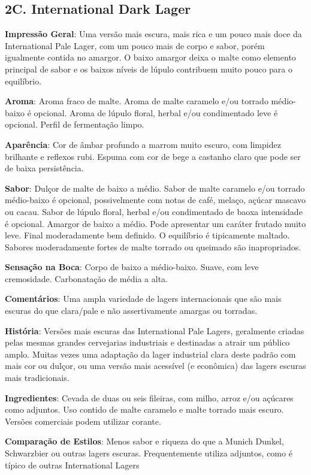 \subsection*{2C. International Dark Lager}
\textbf{Impressão Geral}: Uma versão mais escura, mais rica e um pouco mais doce da International Pale Lager, com um pouco mais de corpo e sabor, porém igualmente contida no amargor. O baixo amargor deixa o malte como elemento principal de sabor e os baixos níveis de lúpulo contribuem muito pouco para o equilíbrio.

\textbf{Aroma}: Aroma fraco de malte. Aroma de malte caramelo e/ou torrado médio-baixo é opcional. Aroma de lúpulo floral, herbal e/ou condimentado leve é opcional. Perfil de fermentação limpo.

\textbf{Aparência}: Cor de âmbar profundo a marrom muito escuro, com limpidez brilhante e reflexos rubi. Espuma com cor de bege a castanho claro que pode ser de baixa persistência.

\textbf{Sabor}: Dulçor de malte de baixo a médio. Sabor de malte caramelo e/ou torrado médio-baixo é opcional, possivelmente com notas de café, melaço, açúcar mascavo ou cacau. Sabor de lúpulo floral, herbal e/ou condimentado de baoxa intensidade é opcional. Amargor de baixo a médio. Pode apresentar um caráter frutado muito leve. Final moderadamente bem definido. O equilíbrio é tipicamente maltado. Sabores moderadamente fortes de malte torrado ou queimado são inapropriados.

\textbf{Sensação na Boca}: Corpo de baixo a médio-baixo. Suave, com leve cremosidade. Carbonatação de média a alta.

\textbf{Comentários}: Uma ampla variedade de lagers internacionais que são mais escuras do que clara/pale e não assertivamente amargas ou torradas.

\textbf{História}: Versões mais escuras das International Pale Lagers, geralmente criadas pelas mesmas grandes cervejarias industriais e destinadas a atrair um público amplo. Muitas vezes uma adaptação da lager industrial clara deste padrão com mais cor ou dulçor, ou uma versão mais acessível (e econômica) das lagers escuras mais tradicionais.

\textbf{Ingredientes}: Cevada de duas ou seis fileiras, com milho, arroz e/ou açúcares como adjuntos. Uso contido de malte caramelo e malte torrado mais escuro. Versões comerciais podem utilizar corante.

\textbf{Comparação de Estilos}: Menos sabor e riqueza do que a Munich Dunkel, Schwarzbier ou outras lagers escuras. Frequentemente utiliza adjuntos, como é típico de outras International Lagers

